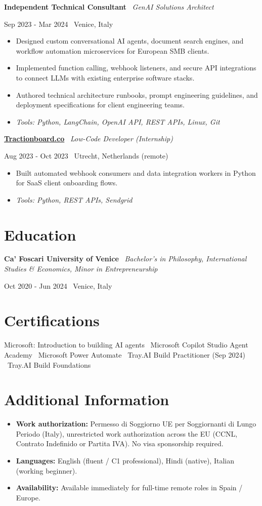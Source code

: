 \documentclass[a4paper,10pt]{article}
\newcommand{\role}[4]{%
  \vspace{2pt}\noindent
  \begin{minipage}[t]{0.70\textwidth}\raggedright\textbf{#1} \textbullet\ \textit{#3}\end{minipage}%
  \hfill
  \begin{minipage}[t]{0.28\textwidth}\raggedleft\footnotesize\color{gray}#2 \textbullet\ #4\end{minipage}%
  \vspace{1pt}%
}
\begin{document}
\role{Independent Technical Consultant}{Sep 2023 - Mar 2024}{GenAI Solutions Architect}{Venice, Italy}
\begin{itemize}
  \item Designed custom conversational AI agents, document search engines, and workflow automation microservices for European SMB clients.
  \item Implemented function calling, webhook listeners, and secure API integrations to connect LLMs with existing enterprise software stacks.
  \item Authored technical architecture runbooks, prompt engineering guidelines, and deployment specifications for client engineering teams.
  \item \textit{Tools: Python, LangChain, OpenAI API, REST APIs, Linux, Git}
\end{itemize}

\role{\href{https://tractionboard.co}{Tractionboard.co}}{Aug 2023 - Oct 2023}{Low-Code Developer (Internship)}{Utrecht, Netherlands (remote)}
\begin{itemize}
  \item Built automated webhook consumers and data integration workers in Python for SaaS client onboarding flows.
  \item \textit{Tools: Python, REST APIs, Sendgrid}
\end{itemize}

\section{Education}
\role{Ca' Foscari University of Venice}{Oct 2020 - Jun 2024}{Bachelor's in Philosophy, International Studies \& Economics, Minor in Entrepreneurship}{Venice, Italy}

\section{Certifications}
Microsoft: Introduction to building AI agents \textbullet\ Microsoft Copilot Studio Agent Academy \textbullet\ Microsoft Power Automate \textbullet\ Tray.AI Build Practitioner (Sep 2024) \textbullet\ Tray.AI Build Foundations

\section{Additional Information}
\begin{itemize}
  \item \textbf{Work authorization:} Permesso di Soggiorno UE per Soggiornanti di Lungo Periodo (Italy), unrestricted work authorization across the EU (CCNL, Contrato Indefinido or Partita IVA). No visa sponsorship required.
  \item \textbf{Languages:} English (fluent / C1 professional), Hindi (native), Italian (working beginner).
  \item \textbf{Availability:} Available immediately for full-time remote roles in Spain / Europe.
\end{itemize}
\end{document}

